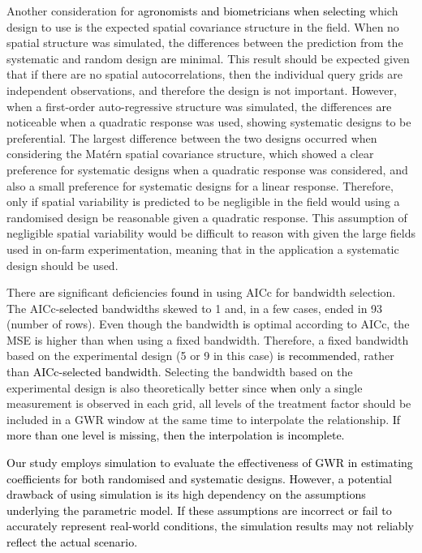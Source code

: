 \documentclass[a4paper]{article} 	%
\newcommand{\Matern}{Mat\'ern }
\newcommand{\zc}[1]{\textcolor{black}{#1}}
\begin{document}
Another consideration for \zc{agronomists and biometricians when selecting} which design to use is the expected spatial covariance structure in the field. When no spatial structure was simulated, the differences between the prediction from the systematic and random design \zc{are} minimal. This result should be expected given that if there are no spatial autocorrelations, then the individual query grids are independent observations, and therefore the design is not important. However, when a first-order auto-regressive structure was simulated, the differences \zc{are} noticeable when a quadratic response was used, showing systematic designs to be preferential. The largest difference between the two designs occurred when considering the \Matern spatial covariance structure, which showed a clear preference for systematic designs when a quadratic response was considered, and also a small preference for systematic designs for a linear response. Therefore, only if spatial variability \zc{is} predicted to be negligible in the field would using a randomised design be reasonable given a quadratic response. This assumption of negligible spatial variability would be difficult to reason with given the large fields used in on-farm experimentation, meaning that in the application a systematic design should be used. 


There \zc{are} significant deficiencies \zc{found} in using AICc for bandwidth selection. The AICc-\zc{selected} bandwidths skewed to 1 and, in a few cases, ended in 93 (number of rows). Even though the bandwidth \zc{is} optimal according to AICc, the MSE \zc{is} higher than when using a fixed bandwidth. Therefore, a fixed bandwidth based on the experimental design (5 or 9 in this case) \zc{is recommended}, rather than \zc{AICc-selected bandwidth}. Selecting the bandwidth based on the experimental design is also theoretically better since \zc{when} only a single measurement is observed in each grid, all levels of the treatment factor should be included in a GWR window at the same time to interpolate the relationship. \zc{If more than one level is missing, then the interpolation is incomplete.} 


\zc{Our study employs simulation to evaluate the effectiveness of GWR in estimating coefficients for both randomised and systematic designs. However, a potential drawback of using simulation is its high dependency on the assumptions underlying the parametric model. If these assumptions are incorrect or fail to accurately represent real-world conditions, the simulation results may not reliably reflect the actual scenario.}
\end{document}
